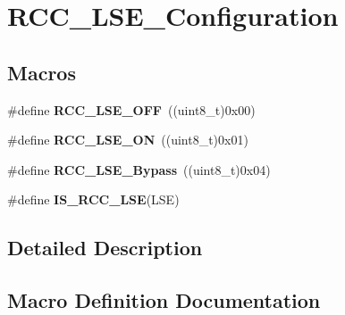 \hypertarget{group___r_c_c___l_s_e___configuration}{}\section{R\+C\+C\+\_\+\+L\+S\+E\+\_\+\+Configuration}
\label{group___r_c_c___l_s_e___configuration}
\subsection*{Macros}
\begin{DoxyCompactItemize}
\item 
\#define {\bfseries R\+C\+C\+\_\+\+L\+S\+E\+\_\+\+O\+FF}~((uint8\+\_\+t)0x00)\hypertarget{group___r_c_c___l_s_e___configuration_ga6645c27708d0cad1a4ab61d2abb24c77}{}\label{group___r_c_c___l_s_e___configuration_ga6645c27708d0cad1a4ab61d2abb24c77}

\item 
\#define {\bfseries R\+C\+C\+\_\+\+L\+S\+E\+\_\+\+ON}~((uint8\+\_\+t)0x01)\hypertarget{group___r_c_c___l_s_e___configuration_gac981ea636c2f215e4473901e0912f55a}{}\label{group___r_c_c___l_s_e___configuration_gac981ea636c2f215e4473901e0912f55a}

\item 
\#define {\bfseries R\+C\+C\+\_\+\+L\+S\+E\+\_\+\+Bypass}~((uint8\+\_\+t)0x04)\hypertarget{group___r_c_c___l_s_e___configuration_gac911af00bffa1bd1b1676f582a8a88e1}{}\label{group___r_c_c___l_s_e___configuration_gac911af00bffa1bd1b1676f582a8a88e1}

\item 
\#define {\bfseries I\+S\+\_\+\+R\+C\+C\+\_\+\+L\+SE}(L\+SE)
\end{DoxyCompactItemize}


\subsection{Detailed Description}


\subsection{Macro Definition Documentation}
